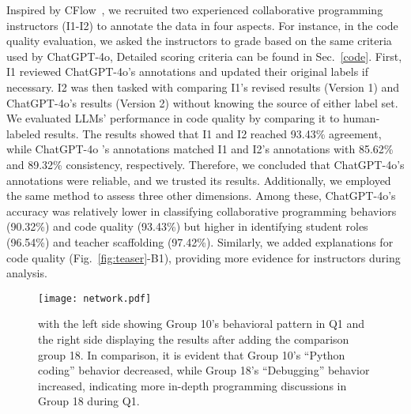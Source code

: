 Inspired by CFlow~\cite{zhang2024cflow}, we recruited two experienced collaborative programming instructors (I1-I2) to annotate the data in four aspects. For instance, in the code quality evaluation, we asked the instructors to grade based on the same criteria used by ChatGPT-4o,  Detailed scoring criteria can be found in Sec.~\ref{code}.
First, I1 reviewed ChatGPT-4o's annotations and updated their original labels if necessary. I2 was then tasked with comparing I1's revised results (Version 1) and ChatGPT-4o's results (Version 2) without knowing the source of either label set.
We evaluated LLMs' performance in code quality by comparing it to human-labeled results.
The results showed that I1 and I2 reached 93.43\% agreement, while ChatGPT-4o 's annotations matched I1 and I2's annotations with 85.62\% and 89.32\% consistency, respectively. Therefore, we concluded that ChatGPT-4o's annotations were reliable, and we trusted its results.
Additionally, we employed the same method to assess three other dimensions.
Among these, ChatGPT-4o's accuracy was relatively lower in classifying collaborative programming behaviors (90.32\%) and code quality (93.43\%) but higher in identifying student roles (96.54\%) and teacher scaffolding (97.42\%). 
 Similarly, we added explanations for code quality (Fig.~\ref{fig:teaser}-B1), providing more evidence for instructors during analysis.


\begin{figure*}
	\centering
	\texttt{[image: network.pdf]}
	\caption{ with the left side showing Group 10's behavioral pattern in Q1 and the right side displaying the results after adding the comparison group 18. In comparison, it is evident that Group 10's ``Python coding'' behavior decreased, while Group 18's ``Debugging'' behavior increased, indicating more in-depth programming discussions in Group 18 during Q1.}
	\label{fig:network} \end{figure*}



